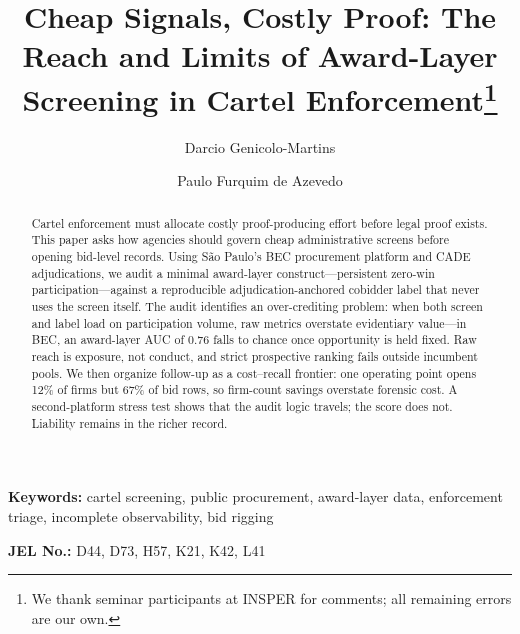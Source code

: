 \begin{frontmatter}

%
\title{Cheap Signals, Costly Proof: The Reach and Limits of Award-Layer Screening in Cartel Enforcement\texorpdfstring{\footnote{We thank seminar participants at INSPER for comments; all remaining errors are our own.}}{}}

\author[insper]{Darcio Genicolo-Martins}
\author[insper]{Paulo Furquim de Azevedo}

%
\begin{abstract}
Cartel enforcement must allocate costly proof-producing effort before
legal proof exists. This paper asks how agencies should govern cheap
administrative screens before opening bid-level records. Using S\~ao
Paulo's BEC procurement platform and CADE adjudications, we audit a
minimal award-layer construct---persistent zero-win
participation---against a reproducible adjudication-anchored cobidder
label that never uses the screen itself. The audit identifies an
over-crediting problem: when both screen and label load on
participation volume, raw metrics overstate evidentiary value---in
BEC, an award-layer AUC of 0.76 falls to chance once opportunity is
held fixed. Raw reach is exposure, not conduct, and strict
prospective ranking fails outside incumbent pools. We then organize
follow-up as a cost--recall frontier: one operating point opens 12\%
of firms but 67\% of bid rows, so firm-count savings overstate
forensic cost.
A second-platform stress test shows that the audit logic travels; the
score does not. Liability remains in the richer record.
\end{abstract}

\end{frontmatter}

\noindent\textbf{Keywords:} cartel screening, public procurement, award-layer data, enforcement triage, incomplete observability, bid rigging

\noindent\textbf{JEL No.:} D44, D73, H57, K21, K42, L41

\bigskip

